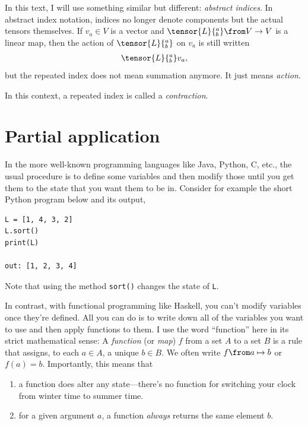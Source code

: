 In this text, I will use something similar but different: \emph{abstract indices}.
In abstract index notation, indices no longer denote components but the actual tensors themselves.
If $v_a \in V$ is a vector and $\tensor{L}{^a_b} \from V \to V$ is a linear map, then the action of $\tensor{L}{^a_b}$ on $v_a$ is still written
\begin{align*}
	\tensor{L}{^a_b} v_a,
\end{align*}
but the repeated index does not mean summation anymore.
It just means \emph{action}.

In this context, a repeated index is called a \emph{contraction}.



\section{Partial application}%
\label{sec:partial_application}

In the more well-known programming languages like Java, Python, C, etc., the usual procedure is to define some variables and then modify those until you get them to the state that you want them to be in.
Consider for example the short Python program below and its output,
\begin{verbatim}
L = [1, 4, 3, 2]
L.sort()
print(L)

out: [1, 2, 3, 4]
\end{verbatim}
Note that using the method \verb|sort()| changes the state of \verb|L|.

In contrast, with functional programming like Haskell, you can't modify variables once they're defined.
All you can do is to write down all of the variables you want to use and then apply functions to them.
I use the word \enquote{function} here in its strict mathematical sense: A \emph{function} (or \emph{map}) $f$ from a set $A$ to a set $B$ is a rule that assigns, to each $a \in A$, a unique $b \in B$.
We often write $f \from a \mapsto b$ or $f(a) = b$.
Importantly, this means that
\begin{enumerate}
	\item a function does alter any state---there's no function for switching your clock from winter time to summer time.
	\item for a given argument $a$, a function \emph{always} returns the same element $b$.
\end{enumerate}

